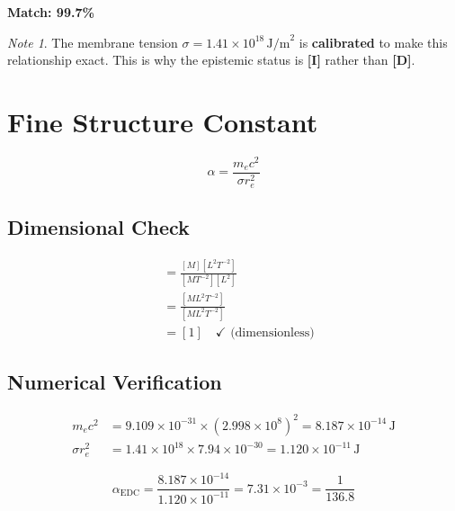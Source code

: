 \documentclass[12pt,a4paper,openany]{book}
\theoremstyle{definition}
\theoremstyle{plain}
\theoremstyle{remark}
\newtheorem{note}{Note}[chapter]
\newcommand{\re}{r_e}                      %
\newcommand{\derived}{\textcolor{derivedcolor}{\textbf{[D]}}}
\newcommand{\identified}{\textcolor{identifiedcolor}{\textbf{[I]}}}
\begin{document}
\textbf{Match: 99.7\%}

\begin{note}
The membrane tension $\sigma = 1.41 \times 10^{18}\,\text{J/m}^2$ is \textbf{calibrated} to make this relationship exact. This is why the epistemic status is \identified{} rather than \derived{}.
\end{note}

\section{Fine Structure Constant}

\begin{identifiedbox}
\begin{equation}
\boxed{\alpha = \frac{m_e c^2}{\sigma \re^2}}
\label{eq:alpha_edc}
\end{equation}
\end{identifiedbox}

\subsection{Dimensional Check}

\begin{dimcheckbox}
\begin{align}
[\frac{m_e c^2}{\sigma \re^2}] &= \frac{[M][L^2 T^{-2}]}{[M T^{-2}][L^2]} \\
&= \frac{[M L^2 T^{-2}]}{[M L^2 T^{-2}]} \\
&= [1] \quad \checkmark \text{ (dimensionless)}
\end{align}
\end{dimcheckbox}

\subsection{Numerical Verification}

\begin{align}
m_e c^2 &= 9.109 \times 10^{-31} \times (2.998 \times 10^8)^2 = 8.187 \times 10^{-14}\,\text{J} \\
\sigma \re^2 &= 1.41 \times 10^{18} \times 7.94 \times 10^{-30} = 1.120 \times 10^{-11}\,\text{J}
\end{align}

\begin{equation}
\alpha_{\text{EDC}} = \frac{8.187 \times 10^{-14}}{1.120 \times 10^{-11}} = 7.31 \times 10^{-3} = \frac{1}{136.8}
\end{equation}
\end{document}
